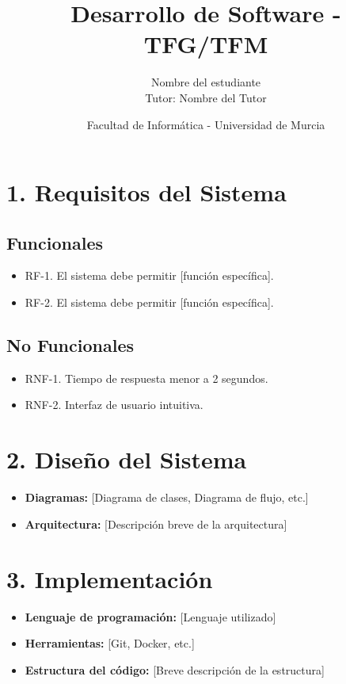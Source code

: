 \documentclass[12pt, a4paper]{article}
\title{\textbf{Desarrollo de Software - TFG/TFM}}
\author{Nombre del estudiante \\ Tutor: Nombre del Tutor}
\date{Facultad de Informática - Universidad de Murcia}
\begin{document}
\maketitle

\section*{1. Requisitos del Sistema}
\subsection*{Funcionales}
\begin{itemize}
    \item RF-1. El sistema debe permitir [función específica].
    \item RF-2. El sistema debe permitir [función específica].
\end{itemize}

\subsection*{No Funcionales}
\begin{itemize}
    \item RNF-1. Tiempo de respuesta menor a 2 segundos.
    \item RNF-2. Interfaz de usuario intuitiva.
\end{itemize}

\section*{2. Diseño del Sistema}
\begin{itemize}
    \item \textbf{Diagramas:} [Diagrama de clases, Diagrama de flujo, etc.]
    \item \textbf{Arquitectura:} [Descripción breve de la arquitectura]
\end{itemize}

\section*{3. Implementación}
\begin{itemize}
    \item \textbf{Lenguaje de programación:} [Lenguaje utilizado]
    \item \textbf{Herramientas:} [Git, Docker, etc.]
    \item \textbf{Estructura del código:} [Breve descripción de la estructura]
\end{itemize}
\end{document}
